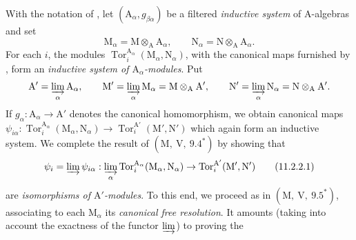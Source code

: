 \begin{env}[11.2.2]
\label{IV.11.2.2}
With the notation of , let
$(\mathrm{A}_\alpha,g_{\beta\alpha})$ be a filtered \emph{inductive system} of
$\mathrm{A}$-algebras and set
\[
  \mathrm{M}_\alpha=\mathrm{M}\otimes_\mathrm{A}\mathrm{A}_\alpha,
  \qquad
  \mathrm{N}_\alpha=\mathrm{N}\otimes_\mathrm{A}\mathrm{A}_\alpha.
\]
For each $i$, the modules
$\operatorname{Tor}_i^{\mathrm{A}_\alpha}
(\mathrm{M}_\alpha,\mathrm{N}_\alpha)$, with the canonical maps furnished
by , form an \emph{inductive system of $\mathrm{A}_\alpha$-modules}. Put
\[
  \mathrm{A}'=\varinjlim_\alpha\mathrm{A}_\alpha,\qquad
  \mathrm{M}'=\varinjlim_\alpha\mathrm{M}_\alpha
    =\mathrm{M}\otimes_\mathrm{A}\mathrm{A}',\qquad
  \mathrm{N}'=\varinjlim_\alpha\mathrm{N}_\alpha
    =\mathrm{N}\otimes_\mathrm{A}\mathrm{A}'.
\]
If $g_\alpha:\mathrm{A}_\alpha\to\mathrm{A}'$ denotes the canonical
homomorphism, we obtain canonical maps $\psi_{i\alpha}:
\operatorname{Tor}_i^{\mathrm{A}_\alpha}
(\mathrm{M}_\alpha,\mathrm{N}_\alpha)
\longrightarrow
\operatorname{Tor}_i^{\mathrm{A}'}(\mathrm{M}',\mathrm{N}')$
which again form an inductive system. We complete the result of
$(\mathrm{M},~\mathrm{V},~9.4^*)$ by showing that
\begin{equation}
  \psi_i=\varinjlim\psi_{i\alpha}:\varinjlim_\alpha\operatorname{Tor}_i^{\mathrm{A}_\alpha}(\mathrm{M}_\alpha,\mathrm{N}_\alpha)\to\operatorname{Tor}_i^{\mathrm{A}'}(\mathrm{M}',\mathrm{N}')
  \label{IV.11.2.2.1}
\tag{11.2.2.1}
\end{equation}
are \emph{isomorphisms of $\mathrm{A}'$-modules}. To this end, we proceed as in $(\mathrm{M},~\mathrm{V},~9.5^*)$, associating to each $\mathrm{M}_\alpha$ its \emph{canonical free resolution}. It amounts (taking into account the exactness of the functor $\varinjlim$) to proving the
\end{env}


